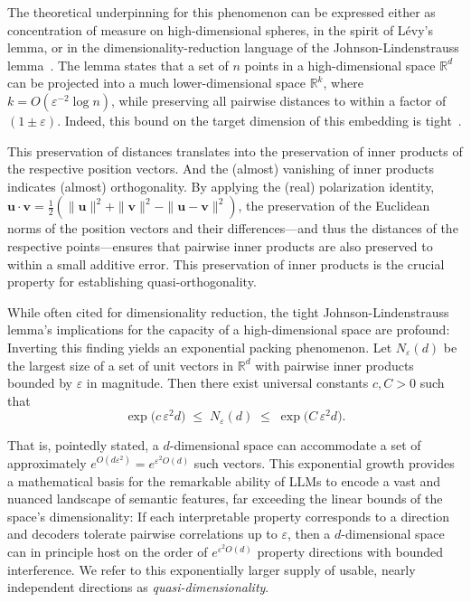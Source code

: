 \documentclass[%
  reprint,
  superscriptaddress,
  showpacs,
  showkeys,
  amsmath,amssymb,
  pra,
  longbibliography,
  floatfix,
  x11names
]{revtex4-2}
\begin{document}
The theoretical underpinning for this phenomenon can be expressed either as
concentration of measure on high-dimensional spheres, in the spirit of
L\'evy's lemma, or in the dimensionality-reduction language of the
Johnson-Lindenstrauss lemma~\cite{johnson-1984}.
The lemma states that a set of $n$ points in a high-dimensional space $\mathbb{R}^d$
can be projected into a much lower-dimensional space $\mathbb{R}^k$,
where $k = O(\varepsilon^{-2} \log n)$,
while preserving all pairwise distances to within a factor of $(1 \pm \varepsilon)$.
Indeed, this bound on the target dimension of this embedding is tight~\cite{alon2016optimal,larsen-nelson-2017}.

This preservation of distances translates into the preservation of inner products of the respective position vectors. And the (almost) vanishing of inner products indicates (almost) orthogonality.
By applying the (real) polarization
identity, $\bm{u} \cdot \bm{v} = \frac{1}{2} \left( \|\bm{u}\|^2 + \|\bm{v}\|^2 - \|\bm{u} - \bm{v}\|^2 \right)$,
the preservation of the Euclidean norms of the position vectors and their differences---and thus the distances of the respective points---ensures that pairwise inner products are also preserved to within a small
additive error. This preservation of inner products is the crucial property
for establishing quasi-orthogonality.



While often cited for dimensionality reduction, the tight Johnson-Lindenstrauss lemma's
implications for the capacity of a high-dimensional space are profound:
Inverting this finding yields an exponential packing phenomenon. Let $N_{\varepsilon}(d)$ be the largest size of a set of unit vectors in $\mathbb{R}^{d}$ with pairwise inner products bounded by $\varepsilon$ in magnitude. Then there exist universal constants $c, C > 0$ such that
\[
  \exp\!\bigl(c\,\varepsilon^{2} d\bigr) \;\le\; N_{\varepsilon}(d) \;\le\; \exp\!\bigl(C\,\varepsilon^{2} d\bigr).
\]


That is, pointedly stated, a $d$-dimensional space can accommodate a set of approximately $e^{O(d\varepsilon^2)}= e^{\varepsilon^2 O(d)}$ such vectors.
This exponential growth provides a mathematical basis for the remarkable ability of LLMs to encode a vast and
nuanced landscape of semantic features, far exceeding the linear bounds of the space's dimensionality:
If each interpretable property corresponds to a direction and decoders tolerate pairwise correlations up to $\varepsilon$,
then a $d$-dimensional space can in principle host on the order of
$e^{\varepsilon^2 O(d)}$ property directions with bounded interference.
We refer to this exponentially larger supply of usable, nearly independent directions as \emph{quasi-dimensionality}.
\end{document}

